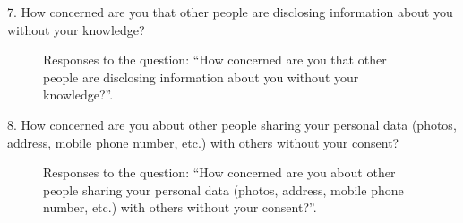 7. How concerned are you that other people are disclosing information about you without your knowledge?

\begin{figure}[H]
    \begin{center}
        \caption{Responses to the question: ``How concerned are you that other people are disclosing information about you without your knowledge?''.}
        \label{fig:survey_s3_q7}
    \end{center}
\end{figure}

8. How concerned are you about other people sharing your personal data (photos, address, mobile phone number, etc.) with others without your consent?

\begin{figure}[H]
    \begin{center}
        \caption{Responses to the question: ``How concerned are you about other people sharing your personal data (photos, address, mobile phone number, etc.) with others without your consent?''.}
        \label{fig:survey_s3_q8}
    \end{center}
\end{figure}

